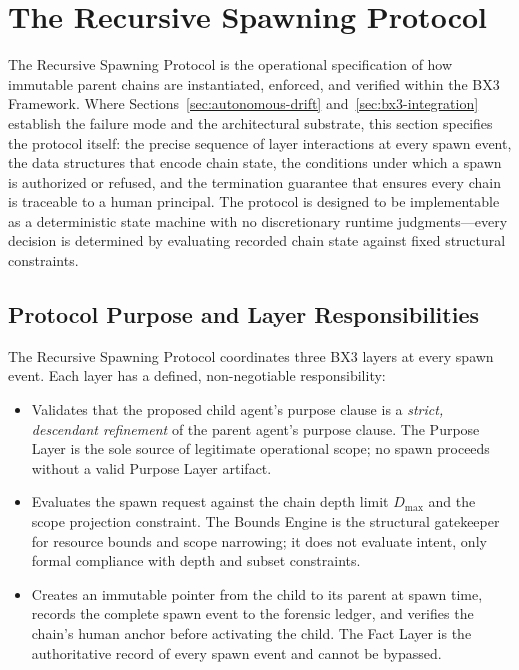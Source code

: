 \section{The Recursive Spawning Protocol}
\label{sec:rs-protocol}

The Recursive Spawning Protocol is the operational specification of how immutable parent chains are instantiated, enforced, and verified within the BX3 Framework. Where Sections~\ref{sec:autonomous-drift} and~\ref{sec:bx3-integration} establish the failure mode and the architectural substrate, this section specifies the protocol itself: the precise sequence of layer interactions at every spawn event, the data structures that encode chain state, the conditions under which a spawn is authorized or refused, and the termination guarantee that ensures every chain is traceable to a human principal. The protocol is designed to be implementable as a deterministic state machine with no discretionary runtime judgments—every decision is determined by evaluating recorded chain state against fixed structural constraints.

\subsection{Protocol Purpose and Layer Responsibilities}

The Recursive Spawning Protocol coordinates three BX3 layers at every spawn event. Each layer has a defined, non-negotiable responsibility:

\begin{itemize}
  \item[\textbf{Purpose Layer.}] Validates that the proposed child agent's purpose clause is a \emph{strict, descendant refinement} of the parent agent's purpose clause. The Purpose Layer is the sole source of legitimate operational scope; no spawn proceeds without a valid Purpose Layer artifact.

  \item[\textbf{Bounds Engine.}] Evaluates the spawn request against the chain depth limit $D_{\max}$ and the scope projection constraint. The Bounds Engine is the structural gatekeeper for resource bounds and scope narrowing; it does not evaluate intent, only formal compliance with depth and subset constraints.

  \item[\textbf{Fact Layer.}] Creates an immutable pointer from the child to its parent at spawn time, records the complete spawn event to the forensic ledger, and verifies the chain's human anchor before activating the child. The Fact Layer is the authoritative record of every spawn event and cannot be bypassed.
\end{itemize}

